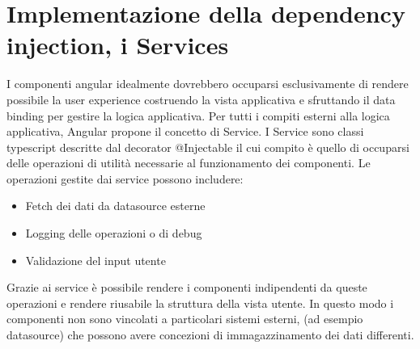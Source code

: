\section{ Implementazione della dependency injection, i Services}
I componenti angular idealmente dovrebbero occuparsi esclusivamente di rendere possibile la user experience costruendo la vista applicativa e sfruttando il data binding per gestire la logica applicativa.
\newline
Per tutti i compiti esterni alla logica applicativa, Angular propone il concetto di Service.
\newline
I Service sono classi typescript descritte dal decorator @Injectable il cui compito è quello di occuparsi delle operazioni di utilità necessarie al funzionamento dei componenti.
Le operazioni gestite dai service possono includere:
\begin{itemize}
    \item Fetch dei dati da datasource esterne
    \item Logging delle operazioni o di debug
    \item Validazione del input utente
\end{itemize}
Grazie ai service è possibile rendere i componenti indipendenti da queste operazioni e rendere riusabile la struttura della vista utente. 
In questo modo i componenti non sono vincolati a particolari sistemi esterni, (ad esempio datasource) che possono avere concezioni di immagazzinamento dei dati differenti.


